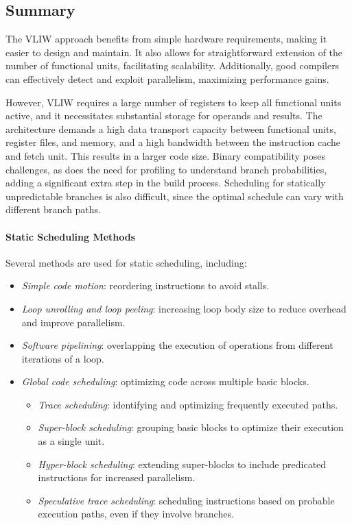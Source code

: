 \subsection{Summary}
The VLIW approach benefits from simple hardware requirements, making it easier to design and maintain. 
It also allows for straightforward extension of the number of functional units, facilitating scalability. 
Additionally, good compilers can effectively detect and exploit parallelism, maximizing performance gains.

However, VLIW requires a large number of registers to keep all functional units active, and it necessitates substantial storage for operands and results. 
The architecture demands a high data transport capacity between functional units, register files, and memory, and a high bandwidth between the instruction cache and fetch unit. 
This results in a larger code size. 
Binary compatibility poses challenges, as does the need for profiling to understand branch probabilities, adding a significant extra step in the build process. 
Scheduling for statically unpredictable branches is also difficult, since the optimal schedule can vary with different branch paths.

\paragraph*{Static Scheduling Methods}
Several methods are used for static scheduling, including:
\begin{itemize}
    \item \textit{Simple code motion}: reordering instructions to avoid stalls.
    \item \textit{Loop unrolling and loop peeling}: increasing loop body size to reduce overhead and improve parallelism.
    \item \textit{Software pipelining}: overlapping the execution of operations from different iterations of a loop.
    \item \textit{Global code scheduling}: optimizing code across multiple basic blocks.
    \begin{itemize}
        \item \textit{Trace scheduling}: identifying and optimizing frequently executed paths.
        \item \textit{Super-block scheduling}: grouping basic blocks to optimize their execution as a single unit.
        \item \textit{Hyper-block scheduling}: extending super-blocks to include predicated instructions for increased parallelism.
        \item \textit{Speculative trace scheduling}: scheduling instructions based on probable execution paths, even if they involve branches.
    \end{itemize}
\end{itemize}